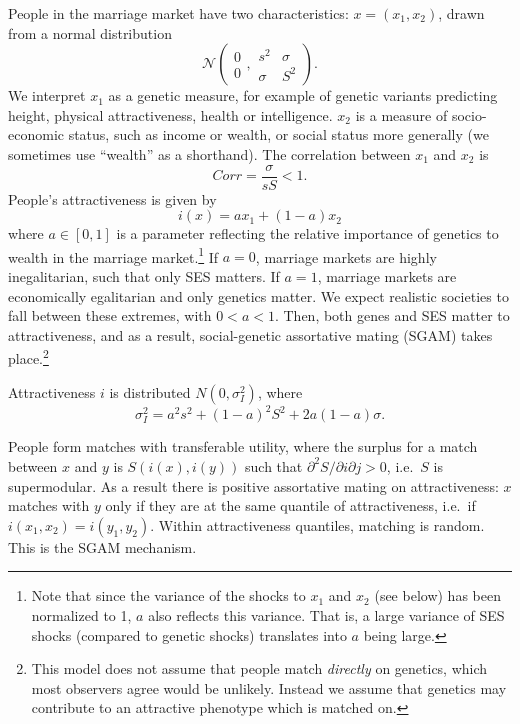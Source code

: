 \documentclass[
  12pt,
]{article}
\theoremstyle{definition}
\theoremstyle{definition}
\theoremstyle{definition}
\theoremstyle{definition}
\theoremstyle{remark}
\begin{document}
People in the marriage market have two characteristics:
\(x=\left( x_{1},x_{2}\right)\), drawn from a normal distribution
\[
\mathcal{N}
\left( 
\begin{array}{c}
0 \\ 
0%
\end{array}%
,%
\begin{array}{cc}
s^{2} & \sigma \\ 
\sigma & S^{2}%
\end{array}%
\right).
\]
We interpret \(x_1\) as a genetic measure, for example of genetic variants predicting
height, physical attractiveness, health or intelligence. \(x_2\) is a measure of
socio-economic status, such as income or wealth, or social status more generally
(we sometimes use ``wealth'' as a shorthand). The correlation between
\(x_1\) and \(x_2\) is
\[
Corr = \frac{\sigma }{sS} < 1.
\]
People's attractiveness is given by
\[
i\left( x\right) =ax_{1}+\left( 1-a\right) x_{2}
\]
where \(a \in [0, 1]\) is a parameter reflecting the relative importance of
genetics to wealth in the marriage market.\footnote{Note that since the variance of the shocks to \(x_1\) and \(x_2\)
  (see below) has been normalized to 1, \(a\) also reflects this variance. That
  is, a large variance of SES shocks (compared to genetic shocks) translates into
  \(a\) being large.} If \(a = 0\),
marriage markets are highly inegalitarian, such that only SES matters. If \(a = 1\), marriage markets are economically egalitarian and only genetics matter. We
expect realistic societies to fall between these extremes, with \(0 < a < 1\).
Then, both genes and SES matter to attractiveness, and as a result,
social-genetic assortative mating (SGAM) takes place.\footnote{This model does not assume that people match \emph{directly} on
  genetics, which most observers agree would be unlikely. Instead we assume that
  genetics may contribute to an attractive phenotype which is matched on.}

Attractiveness \(i\) is
distributed \(N(0,\sigma_{I}^{2})\), where
\[
\sigma _{I}^{2}=a^{2}s^{2}+\left( 1-a\right) ^{2}S^{2}+2a\left( 1-a\right)\sigma.
\]

People form matches with transferable utility, where the surplus for a match
between \(x\) and \(y\) is \(S(i(x), i(y))\) such that \(\partial^{2}S/\partial i\partial j > 0\), i.e.~\(S\) is supermodular. As a result there is positive
assortative mating on attractiveness: \(x\) matches with \(y\) only if they are at
the same quantile of attractiveness, i.e.~if \(i(x_{1},x_{2}) = i(y_{1},y_{2})\).
Within attractiveness quantiles, matching is random. This is the
SGAM mechanism.
\end{document}

